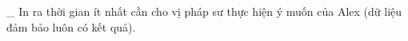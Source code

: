 \_ In ra thời gian ít nhất cần cho vị pháp sư thực hiện ý muốn của Alex (dữ liệu đảm bảo luôn có kết quả).  



\